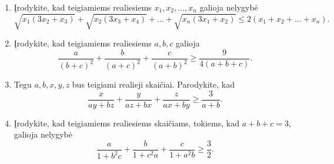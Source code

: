\begin{enumerate}
  \item Įrodykite, kad teigiamiems realiesiems $x_{1},x_{2},...,x_{n}$
    galioja nelygybė
    $$\sqrt{x_{1}(3x_2+x_3)}+\sqrt{x_{2}(3x_3+x_4)}+...+\sqrt{x_n(3x_{1}+x_2)}\leq2(x_{1}+x_2+...+x_n).$$
  \item {} Įrodykite, kad teigiamiems realiesiems
    $a,b,c$ galioja
    $$\frac{a}{(b+c)^2}+\frac{b}{(a+c)^2}+\frac{c}{(a+b)^2}\geq\frac{9}{4(a+b+c)}.$$
  \item Tegu $a,b,x,y,z$ bus teigiami realieji skaičiai. Parodykite, kad
    $$\frac{x}{ay+bz}+\frac{y}{az+bx}+\frac{z}{ax+by}\geq\frac{3}{a+b}.$$
  \item Įrodykite, kad teigiamiems realiesiems skaičiams, tokiems, kad
    $a+b+c=3$, galioja nelygybė
    $$\frac{a}{1+b^2c}+\frac{b}{1+c^2a}+\frac{c}{1+a^2b}\geq\frac{3}{2}.$$

\end{enumerate}

